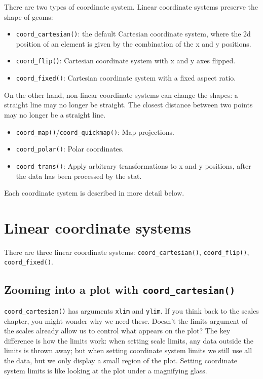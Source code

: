 There are two types of coordinate system. Linear coordinate systems
preserve the shape of geoms:

\begin{itemize}
\item
  \texttt{coord\_cartesian()}: the default Cartesian coordinate system,
  where the 2d position of an element is given by the combination of the
  x and y positions.
\item
  \texttt{coord\_flip()}: Cartesian coordinate system with x and y axes
  flipped.
\item
  \texttt{coord\_fixed()}: Cartesian coordinate system with a fixed
  aspect ratio.
\end{itemize}

On the other hand, non-linear coordinate systems can change the shapes:
a straight line may no longer be straight. The closest distance between
two points may no longer be a straight line.

\begin{itemize}
\item
  \texttt{coord\_map()}/\texttt{coord\_quickmap()}: Map projections.
\item
  \texttt{coord\_polar()}: Polar coordinates.
\item
  \texttt{coord\_trans()}: Apply arbitrary transformations to x and y
  positions, after the data has been processed by the stat.
\end{itemize}

Each coordinate system is described in more detail below.

\hypertarget{sub:cartesian}{%
\section{Linear coordinate systems}\label{sub:cartesian}}

There are three linear coordinate systems: \texttt{coord\_cartesian()},
\texttt{coord\_flip()}, \texttt{coord\_fixed()}.
 

\hypertarget{zooming-into-a-plot-with-coord_cartesian}{%
\subsection{\texorpdfstring{Zooming into a plot with
\texttt{coord\_cartesian()}}{Zooming into a plot with coord\_cartesian()}}\label{zooming-into-a-plot-with-coord_cartesian}}

\texttt{coord\_cartesian()} has arguments \texttt{xlim} and
\texttt{ylim}. If you think back to the scales chapter, you might wonder
why we need these. Doesn't the limits argument of the scales already
allow us to control what appears on the plot? The key difference is how
the limits work: when setting scale limits, any data outside the limits
is thrown away; but when setting coordinate system limits we still use
all the data, but we only display a small region of the plot. Setting
coordinate system limits is like looking at the plot under a magnifying
glass. 

